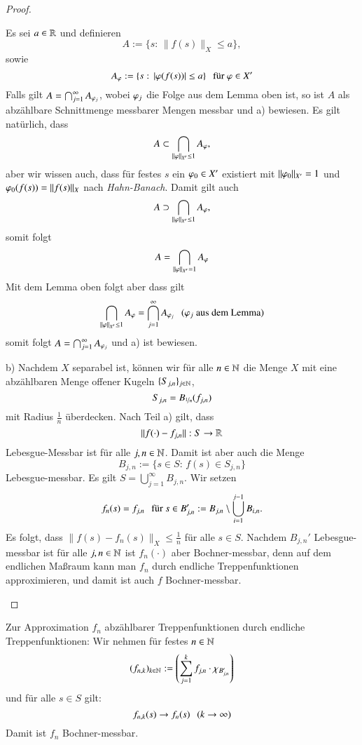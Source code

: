 \begin{proof}
\begin{description}
        \noindent Es sei $a\in \mathbb{R}$ und definieren
        \[
            A:=\{s: \, \|f(s)\|_X\leq a\}, 
        \]
        sowie
        \[
            A_\varphi := \{s: \, |\varphi(f(s))|\leq a  \} \hspace{.25cm} \text{für } \varphi \in X'
        \]
        Falls gilt $A=\bigcap_{j=1}^\infty A_{\varphi_j}$, wobei $\varphi _j$ die Folge aus dem Lemma oben ist,
        so ist $A$ als abzählbare Schnittmenge messbarer Mengen messbar und a) bewiesen. Es gilt
        natürlich, dass
        \[
            A\subset\bigcap_{\|\varphi\|_{X'}\leq 1} A_{\varphi},
        \]
        aber wir wissen auch, dass für festes $s$ ein $\varphi_0\in X'$ existiert mit $\|\varphi_0\|_{X'}=1$ und
        $\varphi_0(f(s))=\|f(s)\|_X$ nach \textit{Hahn-Banach}. Damit gilt auch
        \[
            A\supset \bigcap_{\|\varphi\|_{X'}\leq 1} A_\varphi,
        \]
        somit folgt
        \[
            A=\bigcap _{\|\varphi\|_{X'}=1} A_\varphi
        \]
        Mit dem Lemma oben folgt aber dass gilt
        \[
            \bigcap _{\|\varphi\|_{X'}\leq 1}A_\varphi = \bigcap _{j=1}^\infty A_{\varphi_j} \hspace{.25cm} \text{($\varphi_j$ aus
                    dem Lemma)}
        \]
        somit folgt $A=\bigcap_{j=1}^\infty A_{\varphi_j}$ und a) ist bewiesen.
        \item{b)}
        Nachdem $X$ separabel ist, können wir für alle $n\in \mathbb{N}$ die Menge $X$ mit eine abzählbaren Menge
        offener Kugeln $\{S_{j,n}\}_{j\in\mathbb{N}}$,
        \[
            S_{j,n} = B_{\nicefrac1n} (f_{j,n})
        \]
        mit Radius $\frac1n$ überdecken. Nach Teil a) gilt, dass
        \[
            \|f(\cdot)- f_{j,n}\|:S\rightarrow \mathbb{R}
        \]
        Lebesgue-Messbar ist für alle $j,n\in\mathbb{N}$. Damit ist aber auch die Menge
        \[
            B_{j,n}:=\{s\in S: \, f(s)\in S_{j,n}\}
        \]
        Lebesgue-messbar. Es gilt $S=\bigcup_{j=1}^\infty B_{j,n}$. Wir setzen 
        \[
            f_n(s)= f_{j,n}\hspace{.25cm} \text{für } s\in B_{j,n}':= B_{j,n}\setminus \bigcup_{i=1}^{j-1} B_{i,n}.
        \]
        Es folgt, dass $\|f(s)- f_n(s)\|_X\leq \frac1n$ für alle $s\in S$. Nachdem $B_{j,n}'$
        Lebesgue-messbar ist für alle $j,n\in\mathbb{N}$ ist $f_n(\cdot)$ aber Bochner-messbar, denn auf dem
        endlichen Maßraum kann man $f_n$ durch endliche Treppenfunktionen approximieren, und damit ist
        auch $f$ Bochner-messbar.
    \end{description}
    \[\]
\end{proof}

\begin{remark}
    Zur Approximation $f_n$ abzählbarer Treppenfunktionen durch endliche Treppenfunktionen:
    Wir nehmen für festes $n\in \mathbb{N}$
    \[
        (f_{n,k})_{k\in\mathbb{N}} := \left(\sum_{j=1}^k f_{j,n} \cdot \chi_{B_{j,n}'}\right)
    \]
    und für alle $s\in S$ gilt:
    \[
        f_{n,k}(s) \rightarrow f_n(s) \hspace{.25cm} (k\rightarrow \infty)
    \]
    Damit ist $f_n$ Bochner-messbar.
\end{remark}

